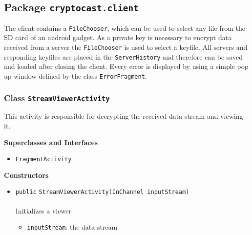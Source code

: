 \subsection{Package \lstinline!cryptocast.client!}
The client contains a \lstinline|FileChooser|, which can be used to select any file from the SD card 
 of an android gadget. As a private key is necessary to encrypt data received from a server the 
 \lstinline|FileChooser| is used to select a keyfile. All servers and responding keyfiles are placed 
 in the \lstinline|ServerHistory| and therefore can be saved and loaded after closing the client.
 Every error is displayed by using a simple pop up window defined by the class \lstinline|ErrorFragment|.
\subsubsection{Class \lstinline|StreamViewerActivity|}
This activity is responsible for decrypting the received data
 stream and viewing it. \\
\noindent\begin{minipage}[t]{5cm}
\vspace{0.3em}
\hspace*{2em}
\vspace{0.3em}
\end{minipage}



\textbf{\sffamily Superclasses and Interfaces}
\begin{itemize}
\item \lstinline|FragmentActivity|
\end{itemize}


\textbf{\sffamily Constructors}
\begin{itemize}
\item \lstinline|public| \lstinline|StreamViewerActivity|\lstinline|(InChannel inputStream)|\\ \\[-0.6em]
Initializes a viewer
\begin{itemize}
\item \lstinline|inputStream|: the data stream
\end{itemize}



\end{itemize}


